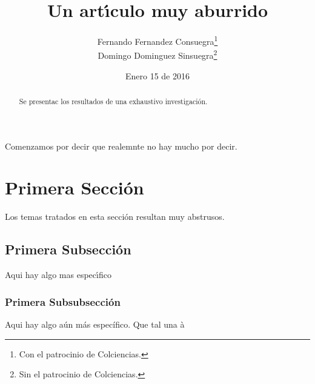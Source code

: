 \documentclass[10pt,draft]{article}
\title{Un art\'{\i}culo muy aburrido}
\author{Fernando Fernandez Consuegra\thanks{Con el patrocinio de Colciencias.}\\
Domingo Dominguez Sinsuegra\thanks{Sin el patrocinio de Colciencias.}}
\date{Enero 15 de 2016}
\begin{document}
    \layout
    \maketitle
    \begin{abstract}
    Se presentac los resultados de una exhaustivo investigaci\'on.
    \end{abstract}
    Comenzamos por decir que realemnte no hay mucho por decir.

    \section{Primera Secci\'on}
    Los temas tratados en esta secci\'on resultan muy abstrusos.
        \subsection{Primera Subsecci\'on}
        Aqui hay algo mas espec\'{\i}fico
            \subsubsection{Primera Subsubsecci\'on}
            Aqui hay algo a\'un m\'as específico. Que tal una \`a
\end{document}
